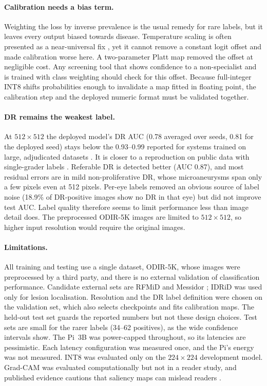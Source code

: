 \documentclass[a4paper,fleqn]{cas-sc}
\begin{document}
\paragraph{Calibration needs a bias term.} Weighting the loss by inverse
prevalence is the usual remedy for rare labels, but it leaves every
output biased towards disease. Temperature scaling is often presented as
a near-universal fix \cite{guo2017calibration}, yet it cannot remove a
constant logit offset and made calibration worse here. A two-parameter
Platt map removed the offset at negligible cost. Any screening tool that
shows confidence to a non-specialist and is trained with class
weighting should check for this offset. Because full-integer INT8 shifts
probabilities enough to invalidate a map fitted in floating point, the
calibration step and the deployed numeric format must be validated
together.

\paragraph{DR remains the weakest label.} At $512\times512$ the deployed
model's DR AUC (0.78 averaged over seeds, 0.81 for the deployed seed)
stays below the 0.93--0.99 reported for systems trained on large,
adjudicated datasets \cite{gulshan2016development,krause2018grader}. It
is closer to a reproduction on public data with single-grader labels
\cite{voets2019reproduction}. Referable DR is detected better (AUC 0.87),
and most residual errors are in mild non-proliferative DR, whose
microaneurysms span only a few pixels even at 512 pixels. Per-eye labels
removed an obvious source of label noise (18.9\% of DR-positive images
show no DR in that eye) but did not improve test AUC. Label quality
therefore seems to limit performance less than image detail does. The
preprocessed ODIR-5K images are limited to $512\times512$, so higher input
resolution would require the original images.

\paragraph{Limitations.} All training and testing use a single dataset,
ODIR-5K, whose images were preprocessed by a third party, and there is no
external validation of classification performance. Candidate external
sets are RFMiD \cite{pachade2021retinal} and Messidor
\cite{decenciere2014feedback}; IDRiD \cite{porwal2018indian} was used only
for lesion localisation. Resolution and the DR label definition were
chosen on the validation set, which also selects checkpoints and fits
calibration maps. The held-out test set guards the reported numbers but
not these design choices. Test sets are small for the rarer labels (34--62
positives), as the wide confidence intervals show. The Pi~3B was
power-capped throughout, so its latencies are pessimistic. Each latency
configuration was measured once, and the Pi's energy was not measured.
INT8 was evaluated only on the $224\times224$ development model. Grad-CAM
was evaluated computationally but not in a reader study, and published
evidence cautions that saliency maps can mislead readers
\cite{sayres2019using,saporta2022benchmarking,ghassemi2021false}.
\end{document}
